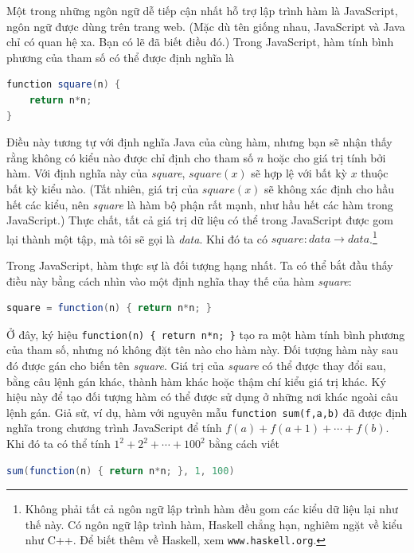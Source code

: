 Một trong những ngôn ngữ dễ tiếp cận nhất hỗ trợ lập trình hàm là JavaScript, ngôn ngữ được dùng trên trang web. (Mặc dù tên giống nhau, JavaScript và Java chỉ có quan hệ xa. Bạn có lẽ đã biết điều đó.) Trong JavaScript, hàm tính bình phương của tham số có thể được định nghĩa là

\begin{lstlisting}[language=Java]
function square(n) {
    return n*n;
}
\end{lstlisting}

Điều này tương tự với định nghĩa Java của cùng hàm, nhưng bạn sẽ nhận thấy rằng không có kiểu nào được chỉ định cho tham số $n$ hoặc cho giá trị tính bởi hàm. Với định nghĩa này của \textit{square}, $\mathit{square}(x)$ sẽ hợp lệ với bất kỳ $x$ thuộc bất kỳ kiểu nào. (Tất nhiên, giá trị của $\mathit{square}(x)$ sẽ không xác định cho hầu hết các kiểu, nên \textit{square} là hàm bộ phận rất mạnh, như hầu hết các hàm trong JavaScript.) Thực chất, tất cả giá trị dữ liệu có thể trong JavaScript được gom lại thành một tập, mà tôi sẽ gọi là \textit{data}. Khi đó ta có $\mathit{square}\colon \mathit{data} \to \mathit{data}$.\footnote{Không phải tất cả ngôn ngữ lập trình hàm đều gom các kiểu dữ liệu lại như thế này. Có ngôn ngữ lập trình hàm, Haskell chẳng hạn, nghiêm ngặt về kiểu như C++. Để biết thêm về Haskell, xem \texttt{www.haskell.org}.}

Trong JavaScript, hàm thực sự là đối tượng hạng nhất. Ta có thể bắt đầu thấy điều này bằng cách nhìn vào một định nghĩa thay thế của hàm \textit{square}:

\begin{lstlisting}[language=Java]
square = function(n) { return n*n; }
\end{lstlisting}

Ở đây, ký hiệu \texttt{function(n) \{ return n*n; \}} tạo ra một hàm tính bình phương của tham số, nhưng nó không đặt tên nào cho hàm này. Đối tượng hàm này sau đó được gán cho biến tên \textit{square}. Giá trị của \textit{square} có thể được thay đổi sau, bằng câu lệnh gán khác, thành hàm khác hoặc thậm chí kiểu giá trị khác. Ký hiệu này để tạo đối tượng hàm có thể được sử dụng ở những nơi khác ngoài câu lệnh gán. Giả sử, ví dụ, hàm với nguyên mẫu \texttt{function sum(f,a,b)} đã được định nghĩa trong chương trình JavaScript để tính $f(a) + f(a+1) + \cdots + f(b)$. Khi đó ta có thể tính $1^2 + 2^2 + \cdots + 100^2$ bằng cách viết

\begin{lstlisting}[language=Java]
sum(function(n) { return n*n; }, 1, 100)
\end{lstlisting}

